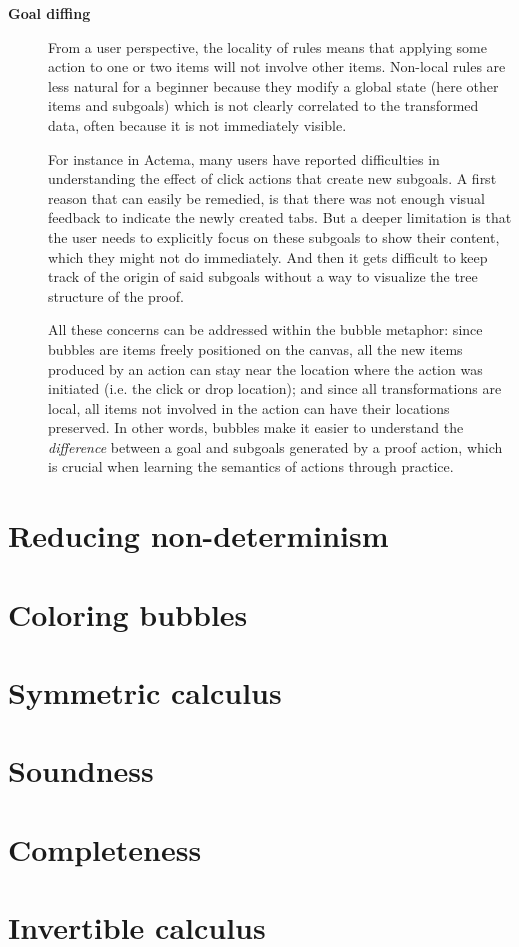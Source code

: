 \begin{description}
  \item[\textbf{Goal diffing}] From a user perspective, the locality of rules
    means that applying some action to one or two items will not involve other
    items.
    Non-local rules are less natural for a beginner because they modify a global
    state (here other items and subgoals) which is not clearly correlated to the
    transformed data, often because it is not immediately visible.

    For instance in Actema, many users have reported difficulties in
    understanding the effect of click actions that create new subgoals. A first
    reason that can easily be remedied, is that there was not enough visual
    feedback to indicate the newly created tabs. But a deeper limitation is that
    the user needs to explicitly focus on these subgoals to show their content,
    which they might not do immediately. And then it gets difficult to keep
    track of the origin of said subgoals without a way to visualize the tree
    structure of the proof.

    All these concerns can be addressed within the bubble metaphor: since
    bubbles are items freely positioned on the canvas, all the new items
    produced by an action can stay near the location where the action was
    initiated (i.e. the click or drop location); and since all transformations
    are local, all items not involved in the action can have their locations
    preserved. In other words, bubbles make it easier to understand the
    \emph{difference} between a goal and subgoals generated by a proof action,
    which is crucial when learning the semantics of actions through practice.
\end{description}

\section{Reducing non-determinism}

\section{Coloring bubbles}

\section{Symmetric calculus}

\section{Soundness}

\section{Completeness}

\section{Invertible calculus}